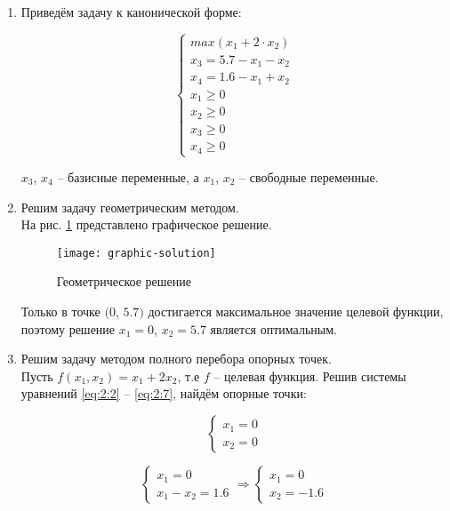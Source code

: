 \begin{enumerate}
	
\item Приведём задачу к канонической форме:

\begin{equation}
\label{eq:2:1}
\begin{cases}
	max \left( x_1 + 2 \cdot x_2 \right)
	\\
	x_3 = 5.7 - x_1 - x_2
	\\
	x_4 = 1.6 - x_1 + x_2
	\\
	x_1 \geq 0
	\\
	x_2 \geq 0
	\\
	x_3 \geq 0	
	\\
	x_4 \geq 0
\end{cases}
\end{equation}	

$x_3$, $x_4$ -- базисные переменные, а $x_1$, $x_2$ -- свободные переменные. 

\item Решим задачу геометрическим методом.\\
\noindent На рис. \ref{pic:graphic-solution} представлено графическое решение.

\begin{figure}[H]
\begin{center}
	\texttt{[image: graphic-solution]}
	\caption{Геометрическое решение}
	\label{pic:graphic-solution}
\end{center}
\end{figure}

Только в точке $(0$, $5.7)$ достигается максимальное значение целевой функции, поэтому решение $x_1 = 0$, $x_2 = 5.7$ является оптимальным. 

\item Решим задачу методом полного перебора опорных точек.\\

Пусть $f(x_1, x_2) = x_1 + 2 x_2$, т.е $f$ -- целевая функция. Решив системы уравнений \ref{eq:2:2} -- \ref{eq:2:7}, найдём опорные точки:

\begin{equation}
\label{eq:2:2}
\begin{cases}
	x_1 = 0
	\\
	x_2 = 0
\end{cases}
\end{equation}

\begin{equation}
\begin{cases}
	x_1 = 0
	\\
	x_1 - x_2 = 1.6
\end{cases}
\Rightarrow
\begin{cases}
	x_1 = 0
	\\
	x_2 = -1.6
\end{cases}
\end{equation}


\end{enumerate}

